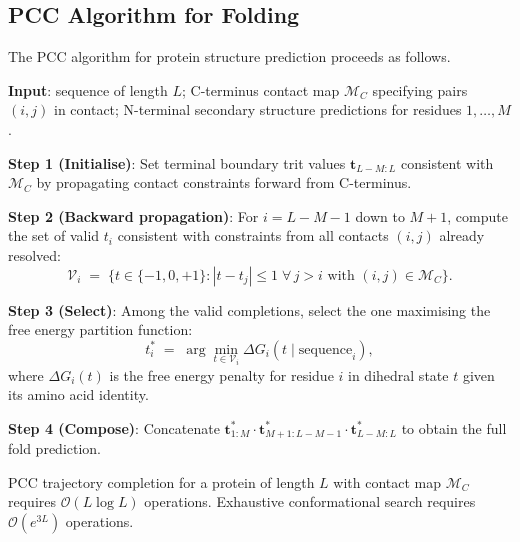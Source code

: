 \subsection{PCC Algorithm for Folding}

The PCC algorithm for protein structure prediction proceeds as follows.

\medskip
\noindent\textbf{Input}: sequence of length $L$; C-terminus contact map
$\mathcal{M}_C$ specifying pairs $(i,j)$ in contact; N-terminal secondary
structure predictions for residues $1, \ldots, M$.

\medskip
\noindent\textbf{Step 1 (Initialise)}:
Set terminal boundary trit values $\mathbf{t}_{L-M:L}$ consistent with
$\mathcal{M}_C$ by propagating contact constraints forward from C-terminus.

\medskip
\noindent\textbf{Step 2 (Backward propagation)}:
For $i = L-M-1$ down to $M+1$, compute the set of valid $t_i$ consistent
with constraints from all contacts $(i, j)$ already resolved:
\begin{equation}
\label{eq:ch05-fold-back}
    \mathcal{V}_i \;=\; \bigl\{
        t \in \{-1,0,+1\} :
        |t - t_j| \leq 1 \;\forall\, j > i \text{ with } (i,j) \in \mathcal{M}_C
    \bigr\}.
\end{equation}

\medskip
\noindent\textbf{Step 3 (Select)}:
Among the valid completions, select the one maximising the free energy
partition function:
\begin{equation}
\label{eq:ch05-fold-select}
    t_i^* \;=\; \arg\min_{t \in \mathcal{V}_i}
    \Delta G_i(t \mid \text{sequence}_i),
\end{equation}
where $\Delta G_i(t)$ is the free energy penalty for residue $i$ in
dihedral state $t$ given its amino acid identity.

\medskip
\noindent\textbf{Step 4 (Compose)}:
Concatenate $\mathbf{t}_{1:M}^* \cdot \mathbf{t}_{M+1:L-M-1}^* \cdot
\mathbf{t}_{L-M:L}^*$ to obtain the full fold prediction.

\begin{theorem}
\label{thm:ch05-fold-complexity}
PCC trajectory completion for a protein of length $L$ with contact map
$\mathcal{M}_C$ requires $\mathcal{O}(L \log L)$ operations.  Exhaustive
conformational search requires $\mathcal{O}(e^{3L})$ operations.
\end{theorem}

